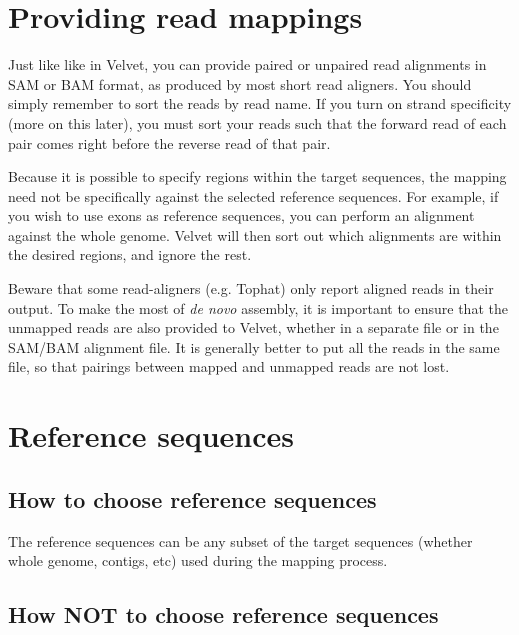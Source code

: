 \documentclass[12pt]{article}
\begin{document}
\section{Providing read mappings}

Just like like in Velvet, you can provide paired or unpaired read alignments in SAM or BAM format, as produced by most short read aligners. You
should simply remember to sort the reads by read name. If you turn on strand specificity (more on this later), you must sort your reads
such that the forward read of each pair comes right before the reverse read of that pair. 

Because it is possible to specify regions within the target sequences, the mapping need not be specifically against the selected reference sequences.
For example, if you wish to use exons as reference sequences, you can perform an alignment against the whole genome. Velvet will then sort out which
alignments are within the desired regions, and ignore the rest.

Beware that some read-aligners (e.g. Tophat) only report aligned reads in their output. To make the most of \emph{de novo} assembly, it is important to ensure that the unmapped reads are also provided to Velvet, whether in a separate file or in the SAM/BAM alignment file. It is generally better to put all the reads in the same file, so that pairings between mapped and unmapped reads are not lost.

\section{Reference sequences}

\subsection{How to choose reference sequences}

The reference sequences can be any subset of the target sequences (whether whole genome, contigs, etc) used during the mapping process. 

\subsection{How \textbf{NOT} to choose reference sequences}
\end{document}
